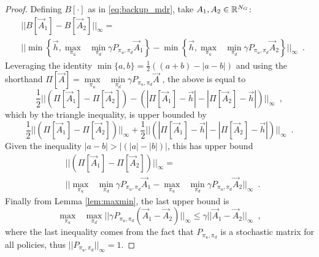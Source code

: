 \begin{proof} Defining $B[\cdot]$ as in \eqref{eq:backup_mdr}, take $A_1, A_2 \in \mathbb{R}^{N_G}$:
\begin{equation*}
\begin{split}
&||B[\vec{A}_1] - B[\vec{A}_2]||_{\infty}=\\
&||\min\left\{ \vec{h}, \underset{\pi_u}{\max}\text{ }\underset{ \pi_d}{\min} \gamma P_{\pi_u, \pi_d} \vec{A}_1 \right \}  - \min\left\{ \vec{h}, \underset{\pi_u}{\max}\text{ }\underset{ \pi_d}{\min} \gamma P_{\pi_u, \pi_d} \vec{A}_2 \right \}||_{\infty}
\enspace .
\end{split}
\end{equation*}%
\noindent Leveraging the identity $\min\{a,b\} = \frac{1}{2}((a+b)- |a-b|)$ and using the shorthand $\Pi[\vec{A}]=\underset{\pi_u}{\max}\text{ }\underset{ \pi_d}{\min} \gamma P_{\pi_u, \pi_d} \vec{A}$ , the above is equal to 
%
\begin{equation*}
\frac{1}{2} ||(\Pi[\vec{A}_1]  - \Pi[\vec{A}_2] ) -  (|\Pi[\vec{A}_1]-\vec{h}|  - |\Pi[\vec{A}_2]-\vec{h}|)||_{\infty} \enspace,
\end{equation*}%
\noindent which by the triangle inequality, is upper bounded by
%
\begin{equation*}
\frac{1}{2} ||(\Pi[\vec{A}_1]  - \Pi[\vec{A}_2] )||_{\infty} + \frac{1}{2}  ||(|\Pi[\vec{A}_1]-\vec{h}|  - |\Pi[\vec{A}_2]-\vec{h}|)||_{\infty} \enspace.
\end{equation*}%
\noindent Given the inequality $|a-b| > |(|a|-|b|)|$, this has upper bound
%
\begin{equation*}
\begin{split}
&||(\Pi[\vec{A}_1]  - \Pi[\vec{A}_2] )||_{\infty}=\\ 
&||\underset{\pi_u}{\max}\text{ }\underset{ \pi_d}{\min} \gamma P_{\pi_u, \pi_d}\vec{A}_1 - \underset{\pi_u}{\max}\text{ }\underset{ \pi_d}{\min} \gamma P_{\pi_u, \pi_d} \vec{A}_2||_{\infty} \enspace.
\end{split}
\end{equation*}%
\noindent Finally from Lemma \ref{lem:maxmin}, the last upper bound is 
\begin{equation*}
\underset{\pi_u}{\max}\text{ }\underset{ \pi_d}{\max} ||\gamma P_{\pi_u, \pi_d} (\vec{A}_1 - \vec{A}_2)||_{\infty} \leq \gamma||\vec{A}_1 - \vec{A}_2||_{\infty} \enspace,
\end{equation*}%
\noindent where the last inequality comes from the fact that $P_{\pi_u, \pi_d}$ is a stochastic matrix for all policies, thus $||P_{\pi_u, \pi_d}||_{\infty} = 1$.
\end{proof}



